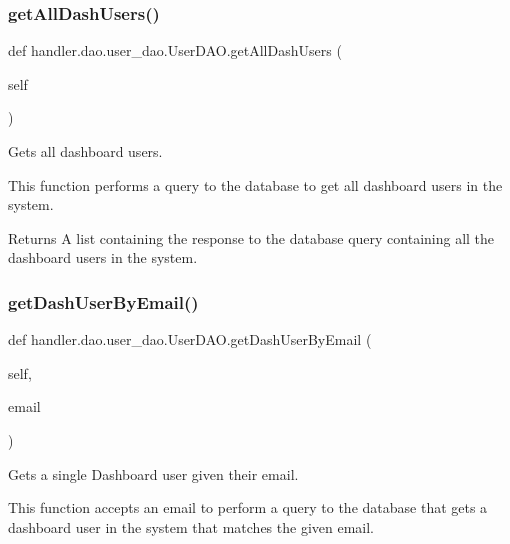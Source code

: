 \subsubsection{\texorpdfstring{get\+All\+Dash\+Users()}{getAllDashUsers()}}
{\footnotesize\ttfamily def handler.\+dao.\+user\+\_\+dao.\+User\+D\+A\+O.\+get\+All\+Dash\+Users (\begin{DoxyParamCaption}\item[{}]{self }\end{DoxyParamCaption})}



Gets all dashboard users. 

This function performs a query to the database to get all dashboard users in the system.

\begin{DoxyReturn}{Returns}
A list containing the response to the database query containing all the dashboard users in the system. 
\end{DoxyReturn}
\mbox{\label{classhandler_1_1dao_1_1user__dao_1_1_user_d_a_o_ad69106a48bfd2570d8f73797ba15a9f0}} 
\subsubsection{\texorpdfstring{get\+Dash\+User\+By\+Email()}{getDashUserByEmail()}}
{\footnotesize\ttfamily def handler.\+dao.\+user\+\_\+dao.\+User\+D\+A\+O.\+get\+Dash\+User\+By\+Email (\begin{DoxyParamCaption}\item[{}]{self,  }\item[{}]{email }\end{DoxyParamCaption})}



Gets a single Dashboard user given their email. 

This function accepts an email to perform a query to the database that gets a dashboard user in the system that matches the given email.


